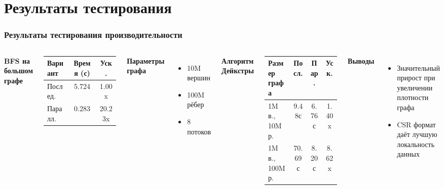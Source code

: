 \documentclass[aspectratio=169]{beamer}
\begin{document}
\section{Результаты тестирования}
\begin{frame}
  \frametitle{Результаты тестирования производительности}
  \begin{columns}
    \textbf{BFS на большом графе}
    \begin{table}
    \centering
    \small  %
    \begin{tabular}{|l|c|c|}
    \hline
    \textbf{Вариант} & \textbf{Время (с)} & \textbf{Уск.} \\
    \hline
    Послед. & 5.724 & 1.00x \\
    \hline
    Паралл. & 0.283 & 20.23x \\
    \hline
    \end{tabular}
    \end{table}

    \textbf{Параметры графа}
    \begin{itemize}
      \item 10M вершин
      \item 100M рёбер
      \item 8 потоков
    \end{itemize}

    \textbf{Алгоритм Дейкстры}
    \begin{table}
    \centering
    \small  %
    \begin{tabular}{|l|c|c|c|}
    \hline
    \textbf{Размер графа} & \textbf{Посл.} & \textbf{Пар.} & \textbf{Уск.} \\
    \hline
    1M в., 10M р. & 9.48с & 6.76с & 1.40x \\
    \hline
    1M в., 100M р. & 70.69с & 8.20с & 8.62x \\
    \hline
    \end{tabular}
    \end{table}

    \textbf{Выводы}
    \begin{itemize}
      \item Значительный прирост при увеличении плотности графа
      \item CSR формат даёт лучшую локальность данных
    \end{itemize}
  \end{columns}
\end{frame}
\end{document}
